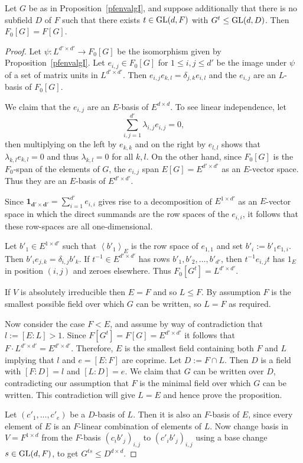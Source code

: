 \begin{Prop}
\label{pfenvalgII}
Let $G$ be as in Proposition~\ref{pfenvalgI}, and suppose
additionally  that 
there is no subfield $D$ of $F$ such that there exists $t \in \GL(d,F)$
with $G^t \leq \GL(d,D)$. Then $F_0[G] = F[G]$.
\end{Prop}
\begin{proof}
Let $\psi : L^{d' \times d'} \to F_0[G]$ be the isomorphism given
by Proposition~\ref{pfenvalgI}. 
Let $e_{i,j} \in F_0[G] $ for $1 \le i,j \le d'$ 
be the image under $\psi$ of a set of matrix units in  $L^{d' \times d'}$. 
Then $e_{i,j} e_{k,l} = \delta_{j,k} e_{i,l}$ %
and the $e_{i,j}$ are an $L$-basis of $F_0[G]$.

We claim that the $e_{i,j}$ are an $E$-basis of $E^{d \times d}$.
 To see linear independence, let
\[ \sum_{i,j=1}^{d'} \lambda_{i,j} e_{i,j} = 0, \]
then multiplying on the left by $e_{k,k}$ and
on the right by $e_{l,l}$ shows that $\lambda_{k,l} e_{k,l} = 0$ and thus
$\lambda_{k,l} = 0$ for all $k,l$.
On the other hand, since $F_0[G]$ is the $F_0$-span of the elements
of $G$, the $e_{i,j}$ span $E[G] = E^{d' \times d'}$ as an
$E$-vector space. Thus they are an $E$-basis of $E^{d' \times d'}$.

Since $\mathbf{1_{d' \times d'}} = \sum_{i=1}^{d'} e_{i,i}$ gives rise to a
decomposition of $E^{1 \times d'}$ as an $E$-vector space in which the
direct summands are the row spaces of the $e_{i,i}$, it follows that
these row-spaces are all one-dimensional.

Let $b'_1 \in E^{1 \times d'}$ such that $\left<b'_1\right>_E$ is the 
row space of $e_{1,1}$ and set $b'_i := b'_1 e_{1,i}$. Then 
$b'_i e_{j,k} = \delta_{i,j} b'_k$. If $t^{-1} \in E^{d' \times d'}$ has
rows $b'_1, b'_2, \ldots, b'_{d'}$, then $t^{-1} e_{i,j} t$ has
 $1_E$ in position $(i,j)$ and zeroes elsewhere.
Thus $F_0[G^t] = L^{d' \times d'}$.

If $V$ is absolutely irreducible then $E=F$ and so $L \le F$.
By assumption $F$ is the
smallest possible field over which $G$ can be written, so
$L = F$ as required.

Now consider the case $F < E$,  and assume by way of contradiction that
$l := [E:L] > 1$. Since $F[G^t] = F[G] = E^{d'
\times d'}$ it follows that $F \cdot L^{d' \times d'} = E^{d' \times d'}$.
Therefore, $E$ is the smallest field containing both $F$ and $L$
implying that  $l$ and $e = [E:F]$ are coprime.
Let $D := F \cap L$. Then $D$ is a field with $[F:D] = l$ and $[L:D] = e$.
We claim that $G$ can be written over $D$, contradicting our
assumption that $F$ is the minimal field over which $G$ can be written. 
This contradiction will give $L = E$ and hence prove the proposition. 

Let $(c'_1, \ldots, c'_e)$ be a $D$-basis of $L$. Then it is also
an $F$-basis of $E$, since every element of $E$ is an $F$-linear
combination of elements of $L$. Now  change basis in $V=F^{1 \times d}$
from the $F$-basis $(c_i b'_j)_{i,j}$ to $(c'_i b'_j)_{i,j}$ 
using a base change $s \in \GL(d,F)$, to get $G^{ts} \leq D^{d
\times d}$.
\end{proof}

